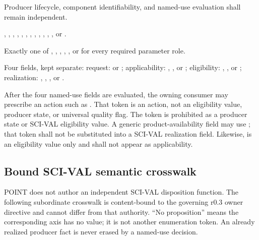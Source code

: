 Producer lifecycle, component identifiability, and named-use evaluation shall
remain independent.

\begin{description}[leftmargin=0.25\linewidth,style=multiline]
\item[Producer lifecycle]
, , ,
, , ,
, ,
, , ,
, or .
\item[Component identifiability]
Exactly one of ,
, ,
, , or
 for every required parameter role.
\item[Named-use evaluation]
Four fields, kept separate:\newline
request:  or ;\newline
applicability: , , or
;\newline
eligibility: , , or
;\newline
realization: , , , or
.
\end{description}

After the four named-use fields are evaluated, the owning consumer may
prescribe an action such as . That token is
an action, not an eligibility value, producer state, or universal quality flag.
The token  is prohibited as a producer state or
SCI-VAL eligibility value. A generic product-availability field may use
; that token shall not be substituted into a SCI-VAL
realization field. Likewise,  is an eligibility
value only and shall not appear as applicability.

\subsection{Bound SCI-VAL semantic crosswalk}\label{sec:val-function}

POINT does not author an independent SCI-VAL disposition function. The
following subordinate crosswalk is content-bound to the governing r0.3 owner
directive and cannot differ from that authority. ``No proposition'' means the
corresponding axis has no value; it is not another enumeration token. An
already realized producer fact is never erased by a named-use decision.

